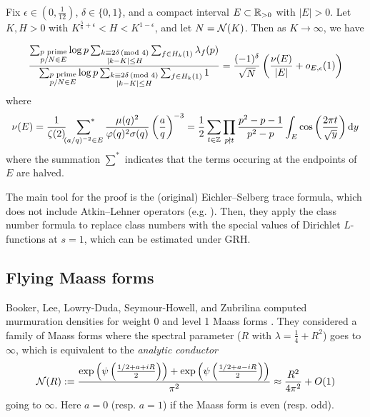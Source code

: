 \begin{theorem}
    \label{thm:bober-lee-ld}
    Fix $\epsilon \in (0, \frac{1}{12})$, $\delta \in \{0, 1\}$, and a compact interval $E \subset \mathbb{R}_{> 0}$ with $|E| > 0$.
    Let $K, H > 0$ with $K^{\frac{5}{6} + \epsilon} < H < K^{1 - \epsilon}$, and let $N = \mathcal{N}(K)$.
    Then as $K \to \infty$, we have

    \begin{equation}
        \frac{
            \sum_{\substack{p \text{ prime} \\ p / N \in E}}
            \log p
            \sum_{\substack{k \equiv 2 \delta \,(\text{mod }4) \\ |k - K| \le H}}
            \sum_{f \in H_k(1)} \lambda_f(p)
        }
        {
            \sum_{\substack{p \text{ prime} \\ p / N \in E}} 
            \log p 
            \sum_{\substack{k \equiv 2 \delta \,(\text{mod }4) \\ |k - K| \le H}} 
            \sum_{f \in H_k(1)} 1
        } = \frac{(-1)^\delta}{\sqrt{N}} \left(\frac{\nu(E)}{|E|} + o_{E, \epsilon}(1)\right)
    \end{equation}
    where
    \begin{equation}
        \label{eqn:nuE}
        \nu(E) = \frac{1}{\zeta(2)} \sideset{}{^{*}}\sum_{(a/q)^{-2} \in E} \frac{\mu(q)^2}{\varphi(q)^2 \sigma(q)} \left(\frac{a}{q}\right)^{-3}
        = \frac{1}{2} \sum_{t \in \mathbb{Z}} \prod_{p \nmid t} \frac{p^2 - p - 1}{p^2 - p} \int_E \cos\left(\frac{2 \pi t}{\sqrt{y}}\right) \mathrm{d} y
    \end{equation}
    where the summation $\sum^{*}$ indicates that the terms occuring at the endpoints of $E$ are halved. 
\end{theorem}

The main tool for the proof is the (original) Eichler--Selberg trace formula, which does not include Atkin--Lehner operators (e.g. \cite[Theorem 2.1]{child2022twist}).
Then, they apply the class number formula to replace class numbers with the special values of Dirichlet $L$-functions at $s = 1$, which can be estimated under GRH.

\subsection{Flying Maass forms}

Booker, Lee, Lowry-Duda, Seymour-Howell, and Zubrilina computed murmuration densities for weight 0 and level 1 Maass forms \cite{booker2024murmurations}.
They considered a family of Maass forms where the spectral parameter ($R$ with $\lambda = \frac{1}{4} + R^2$) goes to $\infty$, which is equivalent to the \emph{analytic conductor} 
\[
\mathcal{N}(R) := \frac{\exp\left(\psi\left(\frac{1/2 + a + iR}{2}\right)\right) + \exp \left(\psi \left(\frac{1/2 + a - iR}{2}\right)\right)}{\pi^2} \approx \frac{R^2}{4 \pi^2} + O(1)
\]
going to $\infty$.
Here $a = 0$ (resp. $a = 1$) if the Maass form is even (resp. odd).

